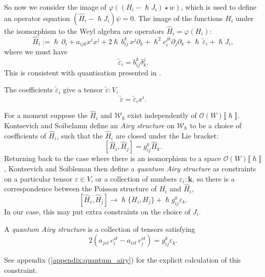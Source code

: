     So now we consider the image of \( \varphi((H_i-\hslash J_i) \star w) \), which is used to define an operator equation \((\widehat{H}_i - \hslash J_i) \psi = 0\).
    The image of the functions \(H_i\) under the isomorphism to the Weyl algebra are operators  \(\widehat{H}_i = \varphi(H_i) \):
    \[ \widehat{H}_i := \hslash\, \partial_i + a_{ijk} x^i x^j +   2 \hslash \,  b_{ij}^k  \, x^j \partial_k + \hslash^2 c_{i}^{jk} \partial_j \partial_k  + \hslash\, \widetilde{\varepsilon}_i + \hslash J_i,\] 
    where we must have 
    \[ \widetilde{\varepsilon}_i = b_{ij}^k \delta_{k}^j.\]
    This is consistent with quantisation presented in \cite{ks_airy}. 
    \begin{rem}
    The coefficients \( \widetilde{\varepsilon}_i\) give a tensor \( \widetilde{\varepsilon}: V\),
    \[ \widetilde{\varepsilon} = \widetilde{\varepsilon}_i x^i.  \]
    \end{rem}
    For a moment suppose the \(\widehat{H}_i\) and \(\mathcal{W}_{\hslash}\) exist independently of \( \mathcal{O}(W)\lBrack\hslash\rBrack\). Kontsevich and Soibelamn define an \emph{Airy structure} on \( \mathcal{W}_{\hslash} \) to be a choice of coefficients of \(\widehat{H}_i\), such that the \(\widehat{H}_i\) are closed under the Lie bracket: 
    \[ [\widehat{H}_i , \widehat{H}_j] = g_{ij}^k \widehat{H}_k.\]
    Returning back to the case where there is an isomorphism to a space \( \mathcal{O}(W)\lBrack \hslash \rBrack\), Kontsevich and Soibleman then define a \emph{quantum Airy structure} as constraints on a particular tensor \(  \varepsilon \in V\), or a collection of numbers \(\varepsilon_i : \mathbf{k}\), so there is a correspondence between the Poisson structure of \(H_i\) and \( \widehat{H}_i\), 
    \[ [\widehat{H}_i , \widehat{H}_j] \rightarrow \hslash \{ H_i , H_j \} + \hslash g_{ij}^k \varepsilon_k. \]
    In our case, this may put extra constraints on the choice of \(J_i\).
    

    
    \begin{defn}
    \label{defn:airystructquant}
    A \emph{quantum Airy structure} is a collection of tensors satisfying
    \[ 2 \left( a_{jst} \, c_i^{st} - a_{ist} \, c_j^{st} \right) = g_{ij}^k \varepsilon_k.\]
    \end{defn}
    See appendix (\ref{appendix:quantum_airy}) for the explicit calculation of this constraint.
    
